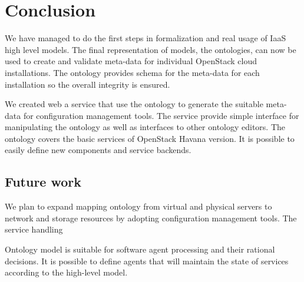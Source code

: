 
\section{Conclusion}

We have managed to do the first steps in formalization and real usage of IaaS high level models. The final representation of models, the ontologies, can now be used to create and validate meta-data for individual OpenStack cloud installations. The ontology provides schema for the meta-data for each installation so the overall integrity is ensured.

We created web a service that use the ontology to generate the suitable meta-data for configuration management tools. The service provide simple interface for manipulating the ontology as well as interfaces to other ontology editors. The ontology covers the basic services of OpenStack Havana version. It is possible to easily define new components and service backends.


\subsection{Future work}

We plan to expand mapping ontology from virtual and physical servers to network and storage resources by adopting configuration management tools. The service handling 

Ontology model is suitable for software agent processing and their rational decisions. It is possible to define agents that will maintain the state of services according to the high-level model.